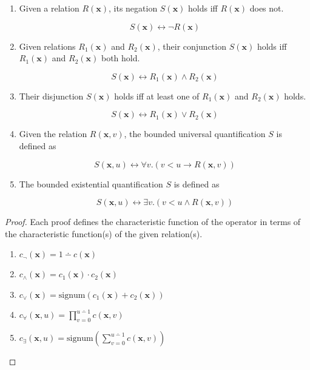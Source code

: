 \begin{enumerate}
    \item Given a relation $R(\mathbf{x})$, its negation
    $S(\mathbf{x})$ holds iff $R(\mathbf{x})$ does not.
    
    $$S(\mathbf{x}) \leftrightarrow \neg R(\mathbf{x})$$
    
    \item Given relations $R_1(\mathbf{x})$ and
    $R_2(\mathbf{x})$, their conjunction $S(\mathbf{x})$ holds iff
    $R_1(\mathbf{x})$ and $R_2(\mathbf{x})$ both hold.
    
    $$S(\mathbf{x}) \leftrightarrow R_1(\mathbf{x}) \wedge R_2(\mathbf{x})$$
    
    \item Their disjunction $S(\mathbf{x})$ holds iff
    at least one of $R_1(\mathbf{x})$ and $R_2(\mathbf{x})$ holds.
    
    $$S(\mathbf{x}) \leftrightarrow R_1(\mathbf{x}) \vee R_2(\mathbf{x})$$
    
    \item Given the relation $R(\mathbf{x}, v)$, the bounded universal 
    quantification $S$ is defined as
    
    $$S(\mathbf{x}, u) \leftrightarrow \forall v. (v < u \rightarrow 
    R(\mathbf{x}, v))$$
    
    \item The bounded existential quantification $S$ is defined as
    
    $$S(\mathbf{x}, u) \leftrightarrow \exists v. (v < u  \wedge 
    R(\mathbf{x}, v))$$
\end{enumerate}

\begin{proof} 
Each proof defines the characteristic function of the operator in 
terms of the characteristic function(s) of the given relation(s).

    \begin{enumerate}
        \item $c_{\neg}(\mathbf{x}) = 1 \dotminus c(\mathbf{x})$
        \item $c_{\wedge}(\mathbf{x}) = c_1(\mathbf{x}) \cdot c_2(\mathbf{x})$
        \item $c_{\vee}(\mathbf{x}) = \mathrm{signum}(c_1(\mathbf{x}) + 
        c_2(\mathbf{x}))$
        \item $c_{\forall}(\mathbf{x}, u) = \prod^{u \dotminus 1}_{v = 0} 
        c(\mathbf{x}, 
        v)$
        \item $c_{\exists}(\mathbf{x}, u) = \mathrm{signum}\left( \sum^{u 
        \dotminus 1}_{v = 0} c(\mathbf{x}, v)\right)$
    \end{enumerate}
\end{proof}

